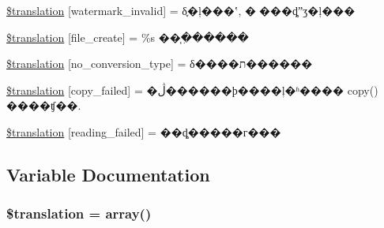 \begin{DoxyCompactItemize}
\item 
\hyperlink{class_8upload_8zh___c_n_8gb-2312_8php_ac336e7a5701e47ba4a05e9e498a3cc44}{\$translation} \mbox{[}\textquotesingle{}watermark\+\_\+invalid\textquotesingle{}\mbox{]} = \textquotesingle{}δ֪�ļ���ʽ, �޷���ȡˮӡ�ļ���\textquotesingle{}
\item 
\hyperlink{class_8upload_8zh___c_n_8gb-2312_8php_a1ecb4673e4fb69e06b3f20b65cecf30a}{\$translation} \mbox{[}\textquotesingle{}file\+\_\+create\textquotesingle{}\mbox{]} = \textquotesingle{}\%s ��֧�ִ�����\textquotesingle{}
\item 
\hyperlink{class_8upload_8zh___c_n_8gb-2312_8php_a4712d7ec28e9a7f17eb3338af2358363}{\$translation} \mbox{[}\textquotesingle{}no\+\_\+conversion\+\_\+type\textquotesingle{}\mbox{]} = \textquotesingle{}δ����ת������\textquotesingle{}
\item 
\hyperlink{class_8upload_8zh___c_n_8gb-2312_8php_a783c9358bcf54a054545b50098bc679b}{\$translation} \mbox{[}\textquotesingle{}copy\+\_\+failed\textquotesingle{}\mbox{]} = \textquotesingle{}�ڷ������ϸ����ļ�ʱ���� copy() ����ʧ��.\textquotesingle{}
\item 
\hyperlink{class_8upload_8zh___c_n_8gb-2312_8php_a01bea14c9fd5f353f62db44beabfcd42}{\$translation} \mbox{[}\textquotesingle{}reading\+\_\+failed\textquotesingle{}\mbox{]} = \textquotesingle{}��ȡ�����г���\textquotesingle{}
\end{DoxyCompactItemize}


\subsection{Variable Documentation}
\hypertarget{class_8upload_8zh___c_n_8gb-2312_8php_a1f198d410fecc3871ebdd468d343a5e3}{}
\subsubsection[{\$translation}]{\setlength{\rightskip}{0pt plus 5cm}\$translation = array()}\label{class_8upload_8zh___c_n_8gb-2312_8php_a1f198d410fecc3871ebdd468d343a5e3}
\hypertarget{class_8upload_8zh___c_n_8gb-2312_8php_ac7498e49b9771b04698029aa61c70821}{}
